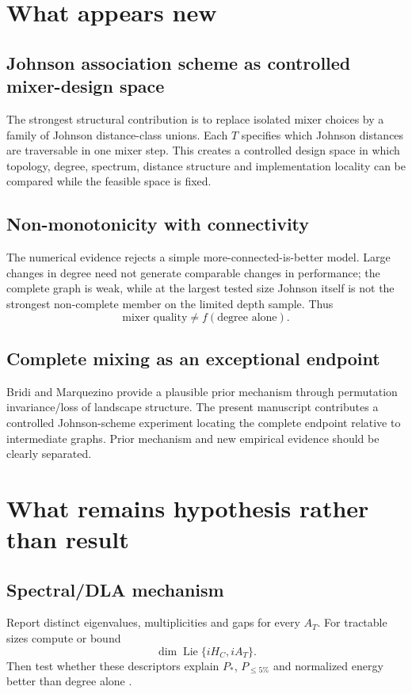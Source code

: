 \documentclass[11pt]{article}
\begin{document}
\section{What appears new}
\subsection{Johnson association scheme as controlled mixer-design space}
The strongest structural contribution is to replace isolated mixer choices by a family of Johnson distance-class unions. Each $T$ specifies which Johnson distances are traversable in one mixer step. This creates a controlled design space in which topology, degree, spectrum, distance structure and implementation locality can be compared while the feasible space is fixed.

\subsection{Non-monotonicity with connectivity}
The numerical evidence rejects a simple more-connected-is-better model. Large changes in degree need not generate comparable changes in performance; the complete graph is weak, while at the largest tested size Johnson itself is not the strongest non-complete member on the limited depth sample. Thus
\[
\text{mixer quality}\neq f(\text{degree alone}).
\]

\subsection{Complete mixing as an exceptional endpoint}
Bridi and Marquezino \cite{Bridi2024} provide a plausible prior mechanism through permutation invariance/loss of landscape structure. The present manuscript contributes a controlled Johnson-scheme experiment locating the complete endpoint relative to intermediate graphs. Prior mechanism and new empirical evidence should be clearly separated.

\section{What remains hypothesis rather than result}
\subsection{Spectral/DLA mechanism}
Report distinct eigenvalues, multiplicities and gaps for every $A_T$. For tractable sizes compute or bound
\[
\dim\operatorname{Lie}\{iH_C,iA_T\}.
\]
Then test whether these descriptors explain $P_*$, $P_{\leq5\%}$ and normalized energy better than degree alone \cite{Bridi2026Expressivity,Kordonowy2026}.
\end{document}
